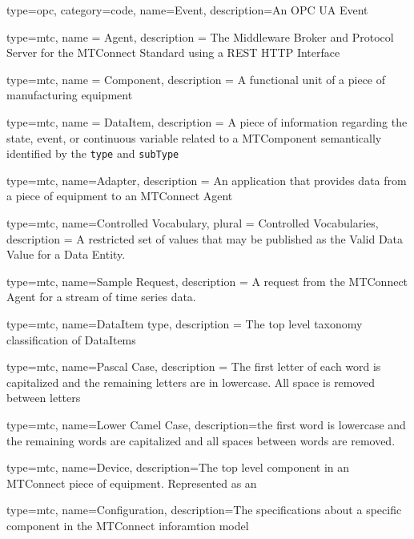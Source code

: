 {
  type=opc,
  category=code,
  name=Event,
  description={An OPC UA Event}
}




{
  type=mtc,
  name = {Agent},
  description = {The Middleware Broker and Protocol Server for the MTConnect Standard using a REST HTTP Interface}
}

{
  type=mtc,
  name = Component,
  description = {A functional unit of a piece of manufacturing equipment}
}

{
  type=mtc,
  name = DataItem,
  description = {A piece of information regarding the state, event, or continuous variable related to a \gls{MTComponent} semantically identified by the \texttt{type} and \texttt{subType}}
}

{
  type=mtc,
  name=Adapter,
  description = {An application that provides data from a piece of equipment to an MTConnect Agent}
}

{
  type=mtc,
  name={Controlled Vocabulary},
  plural = {Controlled Vocabularies},
  description = {A restricted set of values that may be published as the Valid Data Value for a Data Entity.}
}

{
  type=mtc,
  name={Sample Request},
  description = {A request from the MTConnect \gls{Agent} for a stream of time series data.}
}

{
  type=mtc,
  name={DataItem type},
  description = {The top level taxonomy classification of \glspl{DataItem}}
}

{
  type=mtc,
  name={Pascal Case},
  description = {The first letter of each word is capitalized and the remaining letters are in lowercase. All space is removed between letters}
}

{
  type=mtc,
  name={Lower Camel Case},
  description={the first word is lowercase and the remaining words are capitalized and all spaces between words are removed.}
}


{
  type=mtc,
  name=Device,
  description={The top level component in an MTConnect piece of equipment. Represented as an }
}

{
  type=mtc,
  name=Configuration,
  description={The specifications about a specific component in the MTConnect inforamtion model}
}

